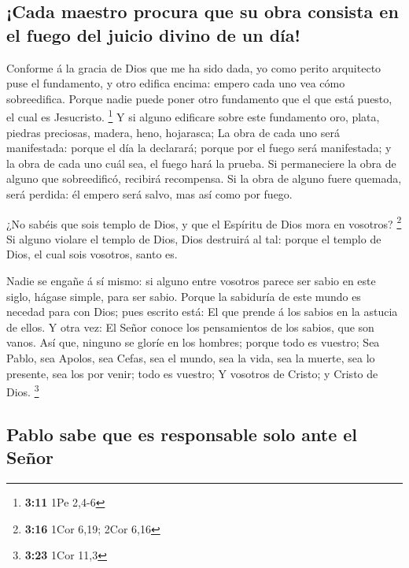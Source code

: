 \hypertarget{cada-maestro-procura-que-su-obra-consista-en-el-fuego-del-juicio-divino-de-un-duxeda}{%
\subsection{¡Cada maestro procura que su obra consista en el fuego del
juicio divino de un
día!}\label{cada-maestro-procura-que-su-obra-consista-en-el-fuego-del-juicio-divino-de-un-duxeda}}

 Conforme á la gracia de Dios que me ha sido dada, yo como
perito arquitecto puse el fundamento, y otro edifica encima: empero cada
uno vea cómo sobreedifica.  Porque nadie puede poner otro
fundamento que el que está puesto, el cual es Jesucristo. \footnote{\textbf{3:11}
  1Pe 2,4-6}  Y si alguno edificare sobre este fundamento
oro, plata, piedras preciosas, madera, heno, hojarasca;  La
obra de cada uno será manifestada: porque el día la declarará; porque
por el fuego será manifestada; y la obra de cada uno cuál sea, el fuego
hará la prueba.  Si permaneciere la obra de alguno que
sobreedificó, recibirá recompensa.  Si la obra de alguno
fuere quemada, será perdida: él empero será salvo, mas así como por
fuego.

 ¿No sabéis que sois templo de Dios, y que el Espíritu de
Dios mora en vosotros? \footnote{\textbf{3:16} 1Cor 6,19; 2Cor 6,16}
 Si alguno violare el templo de Dios, Dios destruirá al
tal: porque el templo de Dios, el cual sois vosotros, santo es.

 Nadie se engañe á sí mismo: si alguno entre vosotros
parece ser sabio en este siglo, hágase simple, para ser sabio.
 Porque la sabiduría de este mundo es necedad para con
Dios; pues escrito está: El que prende á los sabios en la astucia de
ellos.  Y otra vez: El Señor conoce los pensamientos de los
sabios, que son vanos.  Así que, ninguno se gloríe en los
hombres; porque todo es vuestro;  Sea Pablo, sea Apolos,
sea Cefas, sea el mundo, sea la vida, sea la muerte, sea lo presente,
sea los por venir; todo es vuestro;  Y vosotros de Cristo;
y Cristo de Dios. \footnote{\textbf{3:23} 1Cor 11,3}

\hypertarget{pablo-sabe-que-es-responsable-solo-ante-el-seuxf1or}{%
\subsection{Pablo sabe que es responsable solo ante el
Señor}\label{pablo-sabe-que-es-responsable-solo-ante-el-seuxf1or}}


